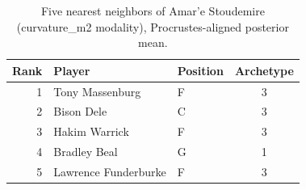 \begin{table}[htbp]
  \centering\small
  \begin{tabular}{rllc}
    \toprule
    Rank & Player & Position & Archetype \\
    \midrule
    1 & Tony Massenburg & F & 3 \\
    2 & Bison Dele & C & 3 \\
    3 & Hakim Warrick & F & 3 \\
    4 & Bradley Beal & G & 1 \\
    5 & Lawrence Funderburke & F & 3 \\
    \bottomrule
  \end{tabular}
  \caption{Five nearest neighbors of Amar'e Stoudemire (curvature_m2 modality), Procrustes-aligned posterior mean.}
  \label{tab:Amar_e_Stoudemire_neighbors_curvature_m2}
\end{table}

